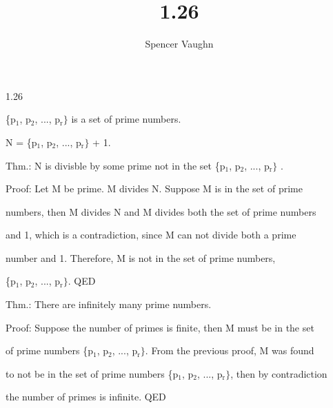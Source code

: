 \documentclass[12pt]{article}
\title{1.26}
\author{Spencer Vaughn}
\begin{document}
1.26

\{p$_{\text{1}}$, p$_{\text{2}}$, ..., p$_{\text{r}}\}$ is a set of prime numbers.

N = \{p$_{\text{1}}$, p$_{\text{2}}$, ..., p$_{\text{r}}\}$ + 1. \newline

Thm.: N is divisble by some prime not in the set \{p$_{\text{1}}$, p$_{\text{2}}$, ..., p$_{\text{r}}\}$ .

Proof: Let M be prime. M divides N. Suppose M is in the set of prime 

numbers, then M divides N and M divides both the set of prime numbers 

and 1, which is a contradiction, since M can not divide both a prime 

number and 1. Therefore, M is not in the set of prime numbers, 

\{p$_{\text{1}}$, p$_{\text{2}}$, ..., p$_{\text{r}}\}$. QED \newline 

Thm.: There are infinitely many prime numbers.

Proof: Suppose the number of primes is finite, then M must be in the set 

of prime numbers \{p$_{\text{1}}$, p$_{\text{2}}$, ..., p$_{\text{r}}\}$. From the previous proof, M was found 

to not be in the set of prime numbers \{p$_{\text{1}}$, p$_{\text{2}}$, ..., p$_{\text{r}}\}$, then by contradiction

the number of primes is infinite. QED
\end{document}
